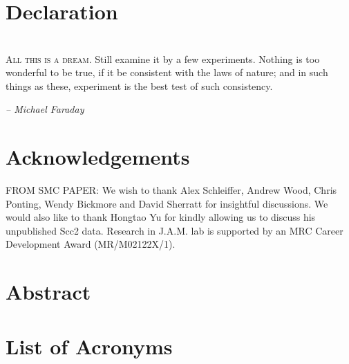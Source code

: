 \documentclass[a4paper,11pt,twoside,openright]{scrbook}
\begin{document}

\chapter*{Declaration}

\chapter*{}
\setlength{\epigraphwidth}{.45\textwidth}
\setlength{\epigraphrule}{0pt}
\epigraph{\textsc{All this is a dream}. Still examine it by a few experiments. Nothing is too wonderful to be true, if it be consistent with the laws of nature; and in such things as these, experiment is the best test of such consistency.}{\textit{-- Michael Faraday}}

\chapter*{Acknowledgements}
FROM SMC PAPER: We wish to thank Alex Schleiffer, Andrew Wood, Chris Ponting, Wendy Bickmore and David Sherratt for insightful discussions. We would also like to thank Hongtao Yu for kindly allowing us to discuss his unpublished Scc2 data. Research in J.A.M. lab is supported by an MRC Career Development Award (MR/M02122X/1).

\chapter*{Abstract}

\clearpage
\tableofcontents
{}

\clearpage
\listoffigures
{}

\clearpage
\listoftables
{}
\clearpage

\chapter*{List of Acronyms}

\begin{acronym}[proteins]
\end{acronym}
\end{document}

